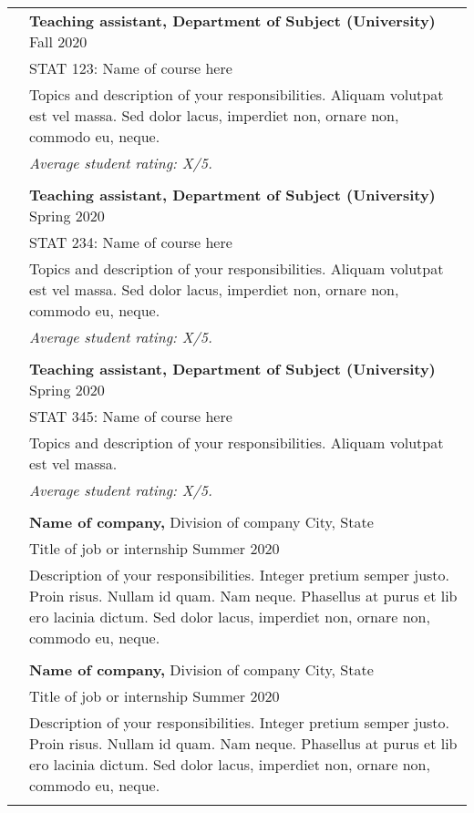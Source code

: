 \documentclass[letterpaper, 11pt]{article}
\begin{document}
\begin{longtable}{p{1.3in}p{4.8in}}
{\color{OliveGreen}{Teaching experience}}
& \textbf{Teaching assistant, Department of Subject (University)} \hfill Fall 2020 \\
& STAT 123: Name of course here \\
& Topics and description of your responsibilities. Aliquam volutpat est vel massa. Sed dolor lacus, imperdiet non, ornare non, commodo eu, neque. \\
& \textit{Average student rating: X/5.} \\
& \\

& \textbf{Teaching assistant, Department of Subject (University)} \hfill Spring 2020 \\
& STAT 234: Name of course here \\
& Topics and description of your responsibilities. Aliquam volutpat est vel massa. Sed dolor lacus, imperdiet non, ornare non, commodo eu, neque. \\
& \textit{Average student rating: X/5.} \\
& \\

& \textbf{Teaching assistant, Department of Subject (University)} \hfill Spring 2020 \\
& STAT 345: Name of course here \\
& Topics and description of your responsibilities. Aliquam volutpat est vel massa. \\
& \textit{Average student rating: X/5.} \\
& \\


{\color{OliveGreen}{Industry experience}}
& {\textbf{Name of company,}} Division of company \hfill City, State\\
& Title of job or internship \hfill Summer 2020 \\
& Description of your responsibilities. Integer pretium semper justo. Proin risus. Nullam id quam. Nam neque. Phasellus at purus et lib ero lacinia dictum. Sed dolor lacus, imperdiet non, ornare non, commodo eu, neque.\\
& \\

& {\textbf{Name of company,}} Division of company \hfill City, State\\
& Title of job or internship \hfill Summer 2020 \\
& Description of your responsibilities. Integer pretium semper justo. Proin risus. Nullam id quam. Nam neque. Phasellus at purus et lib ero lacinia dictum. Sed dolor lacus, imperdiet non, ornare non, commodo eu, neque.\\
& \\


\end{longtable}
\end{document}
